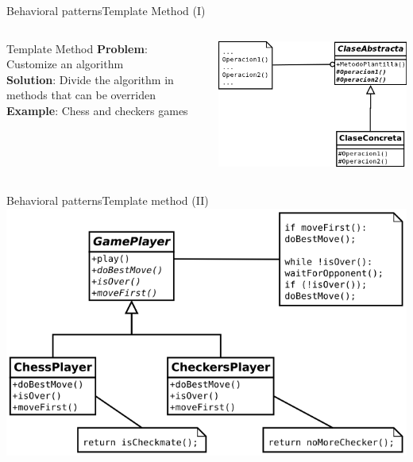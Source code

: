 \documentclass[10pt,compress]{beamer} %
\begin{document}
\begin{frame}{Behavioral patterns}{Template Method (I)}
    \begin{columns}
	   \begin{block}{Template Method}
			\textbf{Problem}: Customize an algorithm\\
			\textbf{Solution}: Divide the algorithm in methods that can be overriden\\
			\textbf{Example}: Chess and checkers games\\
		\end{block}
			\centering\includegraphics[width=0.8\linewidth]{figs/template}\\
	\end{columns}
\end{frame}

\begin{frame}{Behavioral patterns}{Template method (II)}
			\centering\includegraphics[width=0.6\linewidth]{figs/templategame}
\end{frame}
\end{document}

